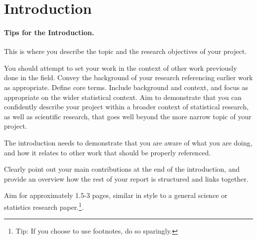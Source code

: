 \section{Introduction}

\paragraph{Tips for the Introduction.} This is where you describe the topic and the research objectives of your project. 

You should attempt to set your work in the context of other work previously done in the field. Convey the background of your research referencing earlier work as appropriate. Define core terms. Include background and context, and focus as appropriate on the wider statistical context. Aim to demonstrate that you can confidently describe your project within a broader context of statistical research, as well as scientific research, that goes well beyond the more narrow topic of your project.


The introduction needs to demonstrate that you are aware of what you are doing, and how it relates to other work that should be properly referenced. 

Clearly point out your main contributions at the end of the introduction, and provide an overview how the rest of your report is structured and links together. 

Aim for approximately 1.5-3 pages, similar in style to a general science or statistics research paper.\footnote{Tip: If you choose to use footnotes, do so sparingly.}.

